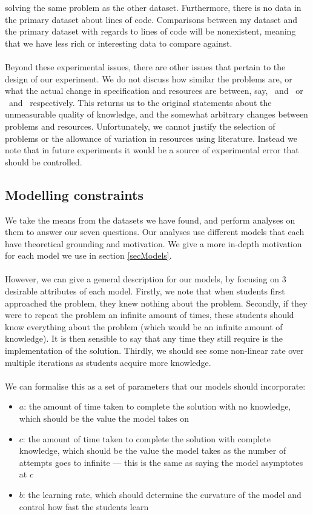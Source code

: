 solving the same problem as the other dataset.
Furthermore, there is no data in the primary dataset about lines of code.
Comparisons between my dataset and the primary dataset with regards to lines of
code will be nonexistent, meaning that we have less rich or interesting data to
compare against.\\
\\
Beyond these experimental issues, there are other issues that pertain to
the design of our experiment.
We do not discuss how similar the problems are, or what the actual change in
specification and resources are between, say, \PO\ and \PT\ or \LA\ and \LB\ 
respectively.
This returns us to the original statements about the unmeasurable quality of
knowledge, and the somewhat arbitrary changes between problems and resources.
Unfortunately, we cannot justify the selection of problems or the allowance of
variation in resources using literature.
Instead we note that in future experiments it would be a source of experimental
error that should be controlled.

\subsection{Modelling constraints} \label{subsecModelling}

We take the means from the datasets we have found, and perform analyses on them
to answer our seven questions.
Our analyses use different models that each have theoretical grounding and
motivation.
We give a more in-depth motivation for each model we use in section
\ref{secModels}.\\
\\
However, we can give a general description for our models, by focusing on
3 desirable attributes of each model.
Firstly, we note that when students first approached the problem, they knew
nothing about the problem.
Secondly, if they were to repeat the problem an infinite amount of times, these students
should know everything about the problem (which would be an infinite amount of
knowledge).
It is then sensible to say that any time they still require is the
implementation of the solution.
Thirdly, we should see some non-linear rate over multiple iterations as students acquire
more knowledge.\\
\\
We can formalise this as a set of parameters that our models should incorporate:
\begin{itemize}
  \item $a$: the amount of time taken to complete the solution with no knowledge,
  which should be the value the model takes on \AZ
  \item $c$: the amount of time taken to complete the solution with complete
  knowledge, which should be the value the model takes as the number of attempts
  goes to infinite --- this is the same as saying the model asymptotes at $c$
  \item $b$: the learning rate, which should determine the curvature of the
  model and control how fast the students learn
\end{itemize}

